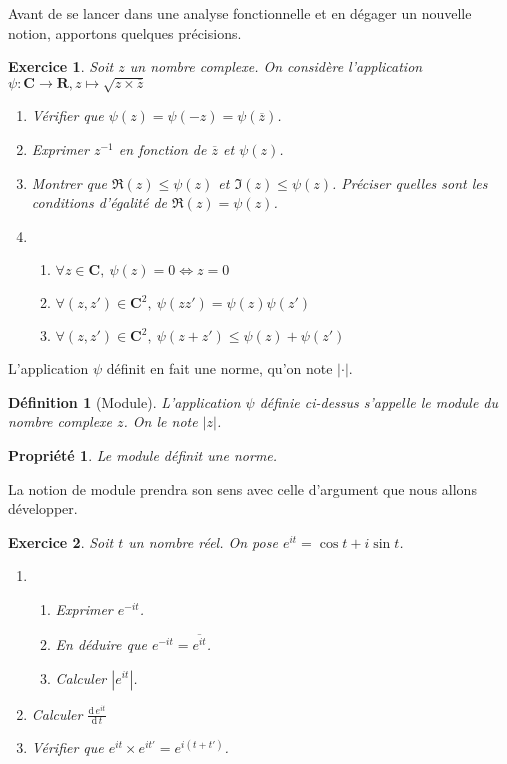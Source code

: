 \documentclass[11pt,a4paper,french]{article}
\newcommand{\R}{\mathbf{R}}
\newcommand{\C}{\mathbf{C}}
\newcommand{\abs}[1]{\left\lvert #1 \right\rvert}
\newcommand{\diff}[1]{\mathrm{d}\,#1}
\theoremstyle{break}
\newtheorem{definition}{Définition}
\newtheorem{propriete}{Propriété}
\theoremstyle{plain}
\newtheorem{exerciceT}{Exercice}
\theoremstyle{nonumberplain}
\theoremstyle{nonumberbreak}
\newenvironment{exercice}{\begin{framed}\begin{exerciceT}}{\end{exerciceT}\end{framed}}
\begin{document}
Avant de se lancer dans une analyse fonctionnelle et en dégager un
nouvelle notion, apportons quelques précisions.

\begin{exercice}Soit $z$ un nombre complexe. On considère l'application
  $\psi:\C \to \R, z \mapsto \sqrt{z\times \overline{z}}$
  \begin{enumerate}
    \item Vérifier que $\psi(z) = \psi(-z) = \psi(\overline{z})$.
    \item Exprimer $z^{-1}$ en fonction de $\overline{z}$ et $\psi(z)$.
    \item Montrer que $\Re(z) \leqslant \psi(z)$ et $\Im(z) \leqslant
      \psi(z)$. Préciser quelles sont les conditions d'égalité de
      $\Re(z) = \psi(z)$.
    \item \begin{enumerate}
        \item $\forall z\in \C,\ \psi(z) = 0 \iff z = 0$
        \item $\forall (z,z') \in \C^2,\ \psi(zz') = \psi(z) \psi(z')$
        \item $\forall (z,z') \in \C^2,\ \psi(z + z') \leqslant \psi(z)
          + \psi(z')$
      \end{enumerate}
  \end{enumerate}
\end{exercice}

L'application $\psi$ définit en fait une norme, qu'on note
$\abs{\cdot}$.

\begin{definition}[Module]
  L'application $\psi$ définie ci-dessus s'appelle le \emph{module} du
  nombre complexe $z$. On le note $\abs{z}$.
\end{definition}

\begin{propriete}
  Le module définit une norme.
\end{propriete}

La notion de module prendra son sens avec celle d'argument que nous
allons développer.

\begin{exercice}Soit $t$ un nombre réel. On pose $e^{it} = \cos t +
  i\sin t$.
  \begin{enumerate}
    \item \begin{enumerate}
        \item Exprimer $e^{-it}$.
        \item En déduire que $e^{-it} = \overline{e^{it}}$.
        \item Calculer $\abs{e^{it}}$.
      \end{enumerate}
    \item Calculer $\frac{\diff e^{it}}{\diff t}$
    \item Vérifier que $e^{it}\times e^{it'} = e^{i(t+t')}$.
  \end{enumerate}
\end{exercice}
\end{document}
